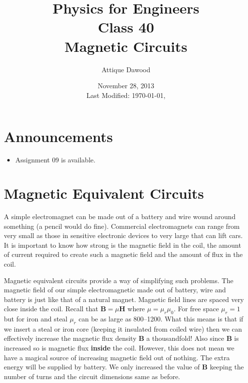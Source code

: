 \documentclass[12pt,a4paper]{article}
\title{\vspace{-3cm}Physics for Engineers\\Class 40\\Magnetic Circuits}
\author{Attique Dawood}
\date{November 28, 2013\\[0.2cm] Last Modified: \today, \currenttime}
\begin{document}
\maketitle
\section{Announcements}
\begin{itemize}
\item Assignment 09 is available.
\end{itemize}
\section{Magnetic Equivalent Circuits}
A simple electromagnet can be made out of a battery and wire wound around something (a pencil would do fine). Commercial electromagnets can range from very small as those in sensitive electronic devices to very large that can lift cars. It is important to know how strong is the magnetic field in the coil, the amount of current required to create such a magnetic field and the amount of flux in the coil.

Magnetic equivalent circuits provide a way of simplifying such problems. The magnetic field of our simple electromagnetic made out of battery, wire and battery is just like that of a natural magnet. Magnetic field lines are spaced very close inside the coil. Recall that $\textbf{B}=\mu\textbf{H}$ where $\mu=\mu_r\mu_0$. For free space $\mu_r=1$ but for iron and steal $\mu_r$ can be as large as 800--1200. What this means is that if we insert a steal or iron core (keeping it insulated from coiled wire) then we can effectively increase the magnetic flux density \textbf{B} a thousandfold! Also since \textbf{B} is increased so is magnetic flux \textbf{inside} the coil. However, this does not mean we have a magical source of increasing magnetic field out of nothing. The extra energy will be supplied by battery. We only increased the value of \textbf{B} keeping the number of turns and the circuit dimensions same as before.
\end{document}
